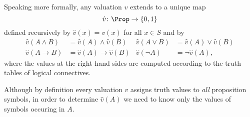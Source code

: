 

\setcounter{section}{1}
\setcounter{subsection}{2}
\setcounter{dfn}{3}


Speaking more formally, any valuation $v$ extends to a unique map
\[
\hat{v} \colon \Prop \to \{0,1\}
\]
defined recursively by $\hat{v}(x) = v(x)$ for all $x \in S$ and by
\begin{align*}
\hat{v}(A \wedge B) &= \hat{v}(A) \wedge \hat{v}(B) & \hat{v}(A \vee B) &= \hat{v}(A) \vee \hat{v}(B)\\
\hat{v}(A \to B) &= \hat{v}(A) \to \hat{v}(B) & \hat{v}(\neg A) &= \neg \hat{v}(A),
\end{align*}
where the values at the right hand sides are computed according to the truth tables of logical connectives.

Although by definition every valuation $v$ assigns truth values to \emph{all} proposition symbols,
in order to determine $\hat{v}(A)$ we need to know only the values of symbols occuring in $A$.




